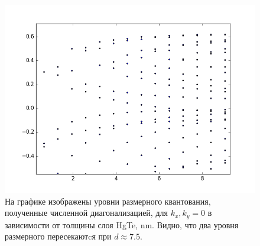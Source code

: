 \begin{figure}[h]
    \includegraphics[width=0.8\linewidth]{dim_quant_levels.png}
    \caption{
            На графике изображены уровни размерного квантования, полученные 
            численной диагонализацией, для $k_x, k_y = 0$
            в зависимости от толщины слоя HgTe, nm. Видно, что два уровня размерного
            пересекаютcя при $d \approx 7.5$.
            }
\end{figure}
